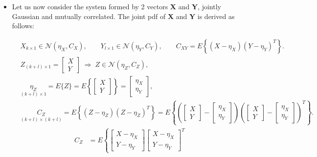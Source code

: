 \begin{itemize}
    \item Let us now consider the system formed by 2 vectors \textbf{X} and \textbf{Y}, jointly Gaussian and mutually correlated. The joint pdf of \textbf{X} and \textbf{Y} is derived as follows:

\begin{align*}
&{X}_{k\times 1} \in \mathcal{N}(\eta_X, C_X), \qquad
Y_{l\times 1} \in \mathcal{N}(\eta_Y, C_Y),\qquad
C_{XY} = E\!\left\{(X-\eta_X)(Y-\eta_Y)^{T}\right\}. \\[8pt]
&Z_{(k+l)\times 1}
= \begin{bmatrix} X \\ Y \end{bmatrix}
 \;\Rightarrow\;
Z \in \mathcal{N}(\eta_Z, C_Z), \\[6pt]
&\underset{(k+l)\times 1}{\eta_Z}
= E\{Z\}
 = E\!\left\{\begin{bmatrix} X \\ Y \end{bmatrix}\right\}
 = \begin{bmatrix} \eta_X \\ \eta_Y \end{bmatrix}, \\[8pt]
&\underset{(k+l)\times(k+l)}{C_Z}
= E\!\left\{(Z-\eta_Z)(Z-\eta_Z)^{T}\right\}= E\!\left\{
   \left(
     \begin{bmatrix} X \\ Y \end{bmatrix}
     - \begin{bmatrix} \eta_X \\ \eta_Y \end{bmatrix}
   \right)
   \left(
     \begin{bmatrix} X \\ Y \end{bmatrix}
     - \begin{bmatrix} \eta_X \\ \eta_Y \end{bmatrix}
   \right)^{T}
  \right\}.
\end{align*}
\begin{align*}
C_Z
&= E\!\left\{
   \begin{bmatrix} X-\eta_X \\[2pt] Y-\eta_Y \end{bmatrix}
   \begin{bmatrix} X-\eta_X \\[2pt] Y-\eta_Y \end{bmatrix}^{T}

\end{align*}
\end{itemize}

